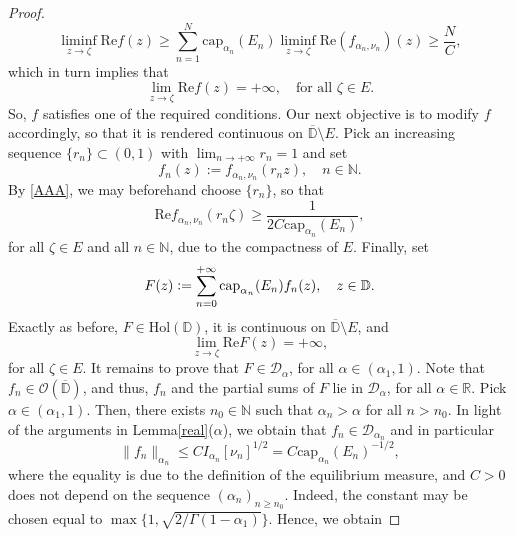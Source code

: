 \documentclass[12pt]{amsart}
\theoremstyle{definition}\newtheorem{remark}[theorem]{Remark}
\theoremstyle{definition}\newtheorem{example}[theorem]{Example}
\theoremstyle{definition}\newtheorem{definition}{Definition}
\numberwithin{equation}{section}
\newcommand\Hol{{\mathrm{Hol}(\mathbb D)}}
\newcommand\cD{{\mathcal D}}
\newcommand\RR{{\mathbb R}}
\newcommand\DD{{\mathbb D}}
\newcommand\DDD{{\mathcal D}}
\begin{document}
\begin{proof}
\begin{equation*}
  \liminf_{z\rightarrow \zeta}\mathrm{Re}f(z)\geq \sum_{n=1}^N \mathrm{cap}_{\alpha_n}(E_n)\liminf_{z\rightarrow \zeta}\mathrm{Re}(f_{\alpha_n,\nu_{n}})(z)\geq \frac{N}{C},  
\end{equation*}
which in turn implies that
\begin{equation*}
  \lim_{z\rightarrow \zeta}\mathrm{Re}f(z)=+\infty, \quad \text{for all }\zeta\in E.  
\end{equation*}
So, $f$ satisfies one of the required conditions. Our next objective is to modify $f$ accordingly, so that it is rendered continuous on $\overline{\DD}\setminus E$. Pick an increasing sequence $\{r_n\}\subset(0,1)$ with $\lim_{n\to+\infty}r_n=1$ and set 
\begin{equation*}
f_n(z):=f_{\alpha_n,\nu_n}(r_nz), \quad n\in\mathbb{N}.    
\end{equation*}
By \eqref{AAA}, we may beforehand choose $\{r_n\}$, so that
\begin{equation*}
\mathrm{Re}f_{\alpha_n,\nu_n}(r_n\zeta)\geq \frac{1}{2C\mathrm{cap}_{\alpha_n}(E_n)},
\end{equation*}
for all $\zeta \in E$ and all $n\in\mathbb{N}$, due to the compactness of $E$. Finally, set 
\begin{equation*}
   F(z)\vcentcolon=\sum_{n=0}^{+\infty}\mathrm{cap}_{\alpha_n}(E_n)f_{n}(z), \quad z\in \DD. 
\end{equation*}
Exactly as before, $F\in \Hol$, it is continuous on $\overline{\DD}\setminus E$, and
\begin{equation*}
\lim_{z\rightarrow \zeta}\mathrm{Re}F(z)=+\infty,    
\end{equation*}
for all $\zeta\in E$. It remains to prove that $F\in \cD_\alpha$, for all $\alpha\in (\alpha_1,1)$. Note that $f_n\in \mathcal{O}(\overline{\DD})$, and thus, $f_n$ and the partial sums of $F$ lie in $\DDD_\alpha$, for all $\alpha\in \RR$. Pick $\alpha\in (\alpha_1,1)$. Then, there exists $n_0\in \mathbb N$ such that $\alpha_n>\alpha$ for all $n> n_0$. In light of the arguments in Lemma\ref{real}\textup{($\alpha$)}, we obtain that $f_n\in\mathcal{D}_{\alpha_n}$ and in particular
\begin{equation}\label{PPP}
\|f_n\|_{\alpha_n}\leq CI_{\alpha_n}[\nu_n]^{1/2}=C\mathrm{cap}_{\alpha_n}(E_n)^{-1/2},
\end{equation}
where the equality is due to the definition of the equilibrium measure, and $C>0$ does not depend on the sequence $(\alpha_n)_{n\geq n_0}$. Indeed, the constant may be chosen equal to $\max\{1,\sqrt{2/\Gamma(1-\alpha_1)}\}$. Hence, we obtain

\end{proof}
\end{document}
